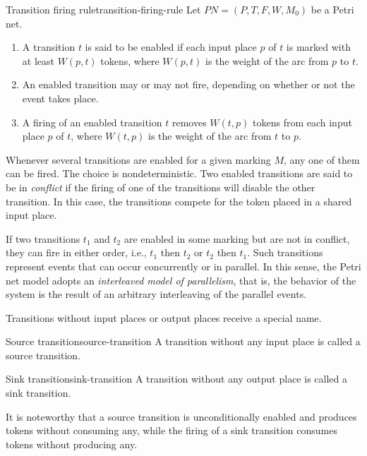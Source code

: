 \begin{definition}{Transition firing rule}{transition-firing-rule}
      Let $ PN = (P, T, F, W, M_{0}) $ be a Petri net.
      \begin{enumerate}[label=(\roman*)]
            \item A transition $t$ is said to be enabled if each input place $p$ of $t$
                  is marked with at least $W(p, t)$ tokens,
                  where $W(p,t)$ is the weight of the arc from $p$ to $t$.
            \item An enabled transition may or may not fire,
                  depending on whether or not the event takes place.
            \item A firing of an enabled transition $t$ removes
                  $W(t,p)$ tokens from each input place $p$ of $t$,
                  where $W(t, p)$ is the weight of the arc from $t$ to $p$.
      \end{enumerate}
\end{definition}

Whenever several transitions are enabled for a given marking $M$,
any one of them can be fired.
The choice is nondeterministic.
Two enabled transitions are said to be in \emph{conflict}
if the firing of one of the transitions will disable the other transition.
In this case, the transitions compete for the token placed in a shared input place.

If two transitions $t_1$ and $t_2$ are enabled in some marking but are not in conflict,
they can fire in either order, i.e., $t_1$ then $t_2$ or $t_2$ then $t_1$.
Such transitions represent events that can occur concurrently or in parallel.
In this sense, the Petri net model adopts an \emph{interleaved model of parallelism}, that is,
the behavior of the system is the result of an arbitrary interleaving of the parallel events.

Transitions without input places or output places receive a special name.

\begin{definition}{Source transition}{source-transition}
      A transition without any input place is called a source transition.
\end{definition}

\begin{definition}{Sink transition}{sink-transition}
      A transition without any output place is called a sink transition.
\end{definition}

It is noteworthy that a source transition is unconditionally enabled
and produces tokens without consuming any, while the firing of a sink transition
consumes tokens without producing any.


